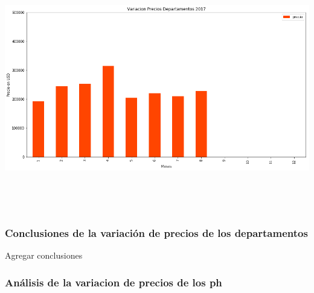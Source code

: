 \documentclass[a4paper, 10pt]{article}
\begin{document}
      \begin{center}
            \includegraphics[width=6in, height=4.2in]{images/vDeptos2017}
      \end{center}

      \subsubsection{Conclusiones de la variación de precios de los departamentos}

      Agregar conclusiones

      \subsubsection{Análisis de la variacion de precios de los ph}
\end{document}
